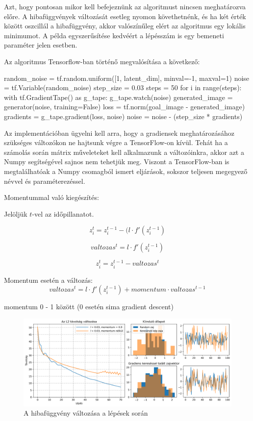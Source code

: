 Azt, hogy pontosan mikor kell befejeznünk az algoritmust nincsen meghatározva előre. A hibafüggvények változását esetleg nyomon követhetnénk, és ha két érték között oszcillál a hibafüggvény, akkor valószínűleg elért az algoritmus egy lokális minimumot. A példa egyszerűsítése kedvéért a lépésszám is egy bemeneti paraméter jelen esetben.

Az algoritmus Tensorflow-ban történő megvalósítása a következő:

\begin{python}
random_noise = tf.random.uniform([1, latent_dim], minval=-1, maxval=1)
noise = tf.Variable(random_noise)
step_size = 0.03
steps = 50
for i in range(steps):
    with tf.GradientTape() as g_tape:
        g_tape.watch(noise)
        generated_image = generator(noise, training=False)
        loss = tf.norm(goal_image - generated_image)
    gradients = g_tape.gradient(loss, noise)
    noise = noise - (step_size * gradients)
\end{python}

Az implementációban ügyelni kell arra, hogy a gradiensek meghatározásához szükséges változókon ne hajtsunk végre a TensorFlow-on kívül. Tehát ha a számolás során mátrix műveleteket kell alkalmazunk a változóinkra, akkor azt a Numpy segítségével sajnos nem tehetjük meg. Viszont a TensorFlow-ban is megtalálhatóak a Numpy csomagból ismert eljárások, sokszor teljesen megegyező névvel és paraméterezéssel.

Momentummal való kiegészítés:

Jelöljük $t$-vel az időpillanatot.

$$ z_i^t = z_i^{t-1} - (l \cdot f'(z_i^{t-1})$$

$$ valtozas^t = l \cdot f'(z_i^{t-1}) $$

$$ z_i^t = z_i^{t-1} - valtozas^t $$


Momentum esetén a változás:
$$ valtozas^t = l \cdot f'(z_i^{t-1}) + momentum \cdot valtozas^{t-1}$$


momentum 0 - 1 között (0 esetén sima gradient descent)


\begin{figure}[h]
\centering
\includegraphics[width=15cm]{images/grad_losses.png}
\caption{A hibafüggvény változása a lépések során}
\label{fig:gradlosses}
\end{figure}



